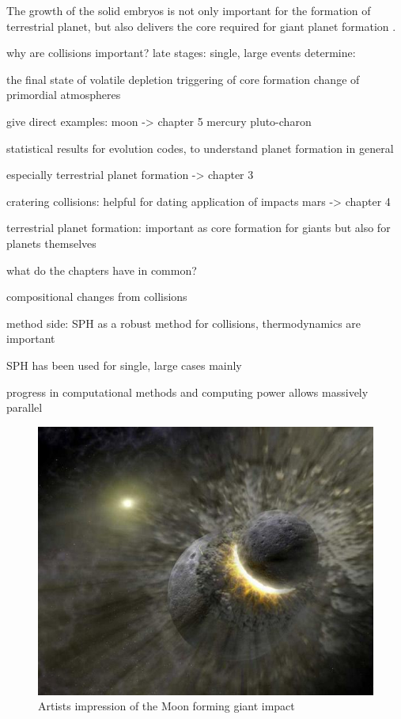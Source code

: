The growth of the solid embryos is not only important for the formation of terrestrial planet, but also delivers the core required for giant planet formation \citep{1996Icar..124...62P}. 


why are collisions important?
late stages: single, large events determine:

the final state of volatile depletion \citep{2001E&PSL.192..545H}
triggering of core formation 
change of primordial atmospheres 

give direct examples:
moon -> chapter 5 \cite{Canup:2001p1861} \cite{1987Icar...71...30B} \cite{1975Icar...24..504H} \cite{1976LPI.....7..120C}
mercury \cite{Benz:1988p3336}
pluto-charon \cite{Canup:2005p1987}

statistical results for evolution codes, to understand planet formation in general 

especially terrestrial planet formation \cite{2006Icar..184...39O} 
\cite{Lisse:2009p3131} -> chapter 3

cratering collisions: helpful for dating 
application of impacts mars -> chapter 4




\cite{Chambers:2004p4098}

terrestrial planet formation: important as core formation for giants but also for planets themselves


what do the chapters have in common?

compositional changes from collisions

method side: SPH as a robust method for collisions, thermodynamics are important

SPH has been used for single, large cases mainly \cite{2005Natur.435..629S}

progress in computational methods and computing power allows massively parallel 


\begin{figure}
\begin{center}
\includegraphics[scale=0.6]{01planet-collision.jpg}
\caption{Artists impression of the Moon forming giant impact}
\label{ch01_fig01}
\end{center}
\end{figure}


